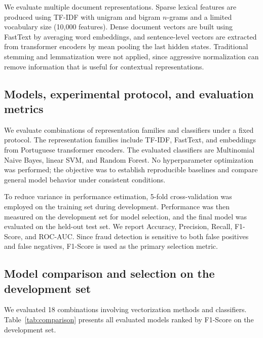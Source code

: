 \documentclass[conference]{IEEEtran}
\begin{document}
We evaluate multiple document representations. Sparse lexical features are produced using TF-IDF with unigram and bigram $n$-grams and a limited vocabulary size (10,000 features). Dense document vectors are built using FastText by averaging word embeddings, and sentence-level vectors are extracted from transformer encoders by mean pooling the last hidden states. Traditional stemming and lemmatization were not applied, since aggressive normalization can remove information that is useful for contextual representations.

\subsection{Models, experimental protocol, and evaluation metrics}

We evaluate combinations of representation families and classifiers under a fixed protocol. The representation families include TF-IDF, FastText, and embeddings from Portuguese transformer encoders. The evaluated classifiers are Multinomial Naive Bayes, linear SVM, and Random Forest. No hyperparameter optimization was performed; the objective was to establish reproducible baselines and compare general model behavior under consistent conditions.

To reduce variance in performance estimation, 5-fold cross-validation was employed on the training set during development. Performance was then measured on the development set for model selection, and the final model was evaluated on the held-out test set. We report Accuracy, Precision, Recall, F1-Score, and ROC-AUC. Since fraud detection is sensitive to both false positives and false negatives, F1-Score is used as the primary selection metric.

\subsection{Model comparison and selection on the development set}

We evaluated 18 combinations involving vectorization methods and classifiers. Table~\ref{tab:comparison} presents all evaluated models ranked by F1-Score on the development set.
\end{document}
